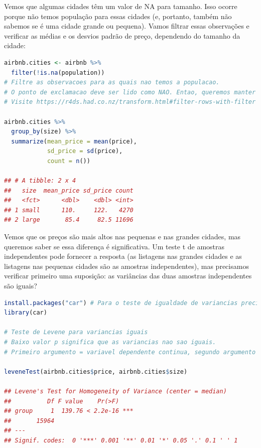\documentclass{article}
\begin{document}
Vemos que algumas cidades têm um valor de NA para tamanho. Isso ocorre porque não temos população para essas cidades (e, portanto, também não sabemos se é uma cidade grande ou pequena). Vamos filtrar essas observações e verificar as médias e os desvios padrão de preço, dependendo do tamanho da cidade:

\begin{lstlisting}[language=R]
airbnb.cities <- airbnb %>% 
  filter(!is.na(population)) 
# Filtre as observacoes para as quais nao temos a populacao.
# O ponto de exclamacao deve ser lido como NAO. Entao, queremos manter as observacoes para as quais a populacao NAO eh NA.
# Visite https://r4ds.had.co.nz/transform.html#filter-rows-with-filter para conhecer mais sobre operadores logicos (veja secao 5.2.2).

airbnb.cities %>% 
  group_by(size) %>% 
  summarize(mean_price = mean(price),
            sd_price = sd(price),
            count = n())

## # A tibble: 2 x 4
##   size  mean_price sd_price count
##   <fct>      <dbl>    <dbl> <int>
## 1 small      110.     122.   4270
## 2 large       85.4     82.5 11696
\end{lstlisting}

Vemos que os preços são mais altos nas pequenas e nas grandes cidades, mas queremos saber se essa diferença é significativa. Um teste t de amostras independentes pode fornecer a resposta (as listagens nas grandes cidades e as listagens nas pequenas cidades são as amostras independentes), mas precisamos verificar primeiro uma suposição: as variâncias das duas amostras independentes são iguais?

\begin{lstlisting}[language=R]
install.packages("car") # Para o teste de igualdade de variancias precisaremos do pacote car.
library(car)

# Teste de Levene para variancias iguais 
# Baixo valor p significa que as variancias nao sao iguais. 
# Primeiro argumento = variavel dependente continua, segundo argumento = variavel independente categorica.

leveneTest(airbnb.cities$price, airbnb.cities$size) 

## Levene's Test for Homogeneity of Variance (center = median)
##          Df F value    Pr(>F)    
## group     1  139.76 < 2.2e-16 ***
##       15964                      
## ---
## Signif. codes:  0 '***' 0.001 '**' 0.01 '*' 0.05 '.' 0.1 ' ' 1
\end{lstlisting}
\end{document}
